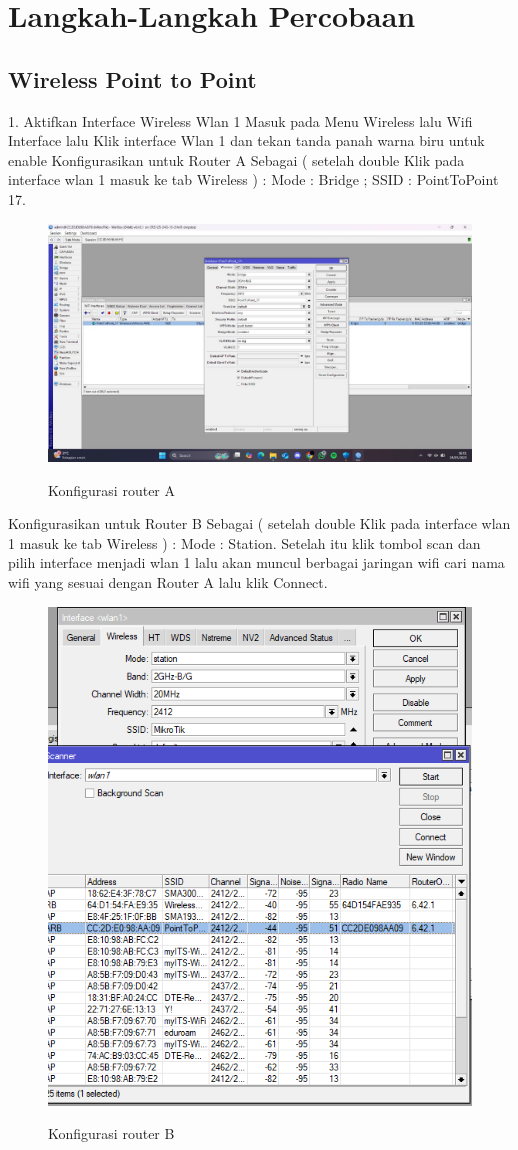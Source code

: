 \section{Langkah-Langkah Percobaan}
\subsection{Wireless Point to Point}
1. Aktifkan Interface Wireless Wlan 1 Masuk pada Menu Wireless lalu Wifi Interface lalu Klik interface Wlan 1 dan tekan tanda panah warna biru untuk enable Konfigurasikan untuk Router A Sebagai ( setelah double Klik pada interface wlan 1 masuk ke tab Wireless ) : Mode : Bridge ; SSID : PointToPoint 17.
\begin{figure}[H]
    \centering
    \includegraphics[width=0.65\linewidth]{image/bridge2.jpg}
    \label{fig:inirujukan}
    \caption{Konfigurasi router A}
\end{figure}
Konfigurasikan untuk Router B Sebagai ( setelah double Klik pada interface wlan 1 masuk ke tab Wireless ) : Mode : Station. Setelah itu klik tombol scan dan pilih interface menjadi wlan 1 lalu akan muncul berbagai jaringan wifi cari nama wifi yang sesuai dengan Router A lalu klik Connect.
\begin{figure}[H]
    \centering
    \includegraphics[width=0.65\linewidth]{image/bridge.png}
    \label{fig:inirujukan}
    \caption{Konfigurasi router B}
\end{figure}

